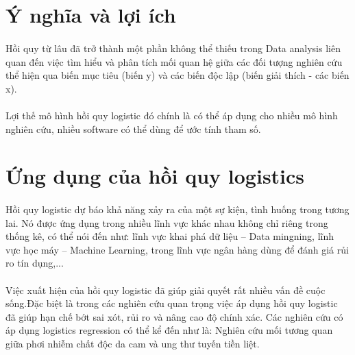 \documentclass{report}
\begin{document}
    \pagebreak
    
    \section{Ý nghĩa và lợi ích}
        \fontsize{13}{10}\selectfont\paragraph{}
            Hồi quy từ lâu đã trở thành một phần không thể thiếu trong Data analysis liên quan đến việc tìm hiểu và phân tích mối quan hệ giữa các đối tượng nghiên cứu thể hiện qua biến mục tiêu (biến y) và các biến độc lập (biến giải thích - các biến x).
        \fontsize{13}{10}\selectfont\paragraph{}
            Lợi thế mô hình hồi quy logistic đó chính là có thể áp dụng cho nhiều mô hình nghiên cứu, nhiều software có thể dùng để ước tính tham số.
    
    \section{Ứng dụng của hồi quy logistics}
        \fontsize{13}{10}\selectfont\paragraph{}
            Hồi quy logistic dự báo khả năng xảy ra của một sự kiện, tình huống trong tương lai. Nó được ứng dụng trong nhiều lĩnh vực khác nhau không chỉ riêng trong thống kê, có thể nói đến như: lĩnh vực khai phá dữ liệu – Data mingning, lĩnh vực học máy – Machine Learning, trong lĩnh vực ngân hàng dùng để đánh giá rủi ro tín dụng,...
        
        \fontsize{13}{10}\selectfont\paragraph{}
            Việc xuất hiện của hồi quy logistic đã giúp giải quyết rất nhiều vấn đề cuộc sống.Đặc biệt là trong các nghiên cứu quan trọng việc áp dụng hồi quy logistic đã giúp hạn chế bớt sai xót, rủi ro và nâng cao độ chính xác. Các nghiên cứu có áp dụng logistics regression có thể kể đến như là: Nghiên cứu mối tương quan giữa phơi nhiễm chất độc da cam và ung thư tuyến tiền liệt.
        
\end{document}
